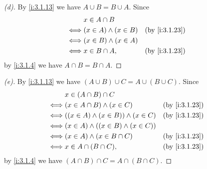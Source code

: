 \begin{proof}[(d)]
  By \cref{i:3.1.13} we have \(A \cup B = B \cup A\).
  Since
  \begin{align*}
         & x \in A \cap B                               \\
    \iff & (x \in A) \land (x \in B) &  & \by{i:3.1.23} \\
    \iff & (x \in B) \land (x \in A)                    \\
    \iff & x \in B \cap A,           &  & \by{i:3.1.23}
  \end{align*}
  by \cref{i:3.1.4} we have \(A \cap B = B \cap A\).
\end{proof}

\begin{proof}[(e)]
  By \cref{i:3.1.13} we have \((A \cup B) \cup C = A \cup (B \cup C)\).
  Since
  \begin{align*}
         & x \in (A \cap B) \cap C                                        \\
    \iff & (x \in A \cap B) \land (x \in C)            &  & \by{i:3.1.23} \\
    \iff & ((x \in A) \land (x \in B)) \land (x \in C) &  & \by{i:3.1.23} \\
    \iff & (x \in A) \land ((x \in B) \land (x \in C))                    \\
    \iff & (x \in A) \land (x \in B \cap C)            &  & \by{i:3.1.23} \\
    \iff & x \in A \cap (B \cap C),                    &  & \by{i:3.1.23}
  \end{align*}
  by \cref{i:3.1.4} we have \((A \cap B) \cap C = A \cap (B \cap C)\).
\end{proof}

